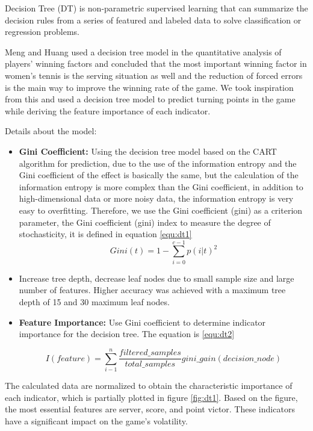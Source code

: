 Decision Tree (DT) is non-parametric supervised learning that can summarize the decision rules from a series of featured and labeled data to solve classification or regression problems. \par
Meng and Huang \cite{ref1} used a decision tree model in the quantitative analysis of players' winning factors and concluded that the most important winning factor in women's tennis is the serving situation as well and the reduction of forced errors is the main way to improve the winning rate of the game. 
We took inspiration from this and used a decision tree model to predict turning points in the game while deriving the feature importance of each indicator. \par
Details about the model: 
\begin{itemize}
    \item \textbf{Gini Coefficient: }
    Using the decision tree model based on the CART algorithm for prediction, due to the use of the information entropy and the Gini coefficient of the effect is basically the same, but the calculation of the information entropy is more complex than the Gini coefficient, in addition to high-dimensional data or more noisy data, the information entropy is very easy to overfitting\cite{ref2}. Therefore, we use the Gini coefficient (gini) as a criterion parameter, the Gini coefficient (gini) index to measure the degree of stochasticity, it is defined in equation \ref{equ:dt1}
    \begin{equation}
        Gini(t) = 1- \sum_{i=0}^{c-1}{p(i|t)^2}
        \label{equ:dt1}
    \end{equation}
    \item Increase tree depth, decrease leaf nodes due to small sample size and large number of features. Higher accuracy was achieved with a maximum tree depth of 15 and 30 maximum leaf nodes.
    \item \textbf{Feature Importance: }Use Gini coefficient to determine indicator importance for the decision tree. The equation is \ref{equ:dt2}

    \begin{equation}
        I(feature)=\sum^n_{i-1}{\frac{filtered\_samples}{total\_samples}gini\_gain(decision\_node)}
        \label{equ:dt2}
    \end{equation}
    
\end{itemize}

The calculated data are normalized to obtain the characteristic importance of each indicator, which is partially plotted in figure \ref{fig:dt1}. Based on the figure, the most essential features are server, score, and point victor. These indicators have a significant impact on the game's volatility.\par


